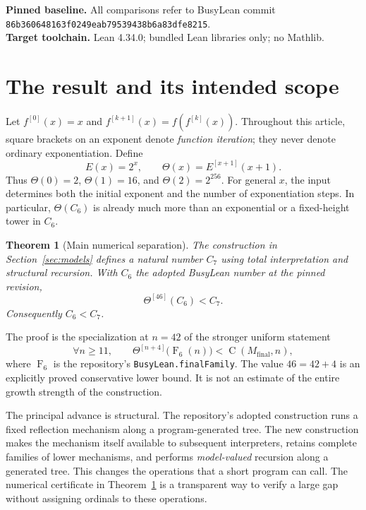 \documentclass[11pt,letterpaper]{article}
\newtheorem{theorem}{Theorem}[section]
\theoremstyle{definition}
\newcommand{\Val}{\operatorname{C}}
\newcommand{\FF}{\operatorname{F}}
\newcommand{\Iter}[2]{#1^{[#2]}}
\newcommand{\code}[1]{\texttt{#1}}
\begin{document}
\noindent\textbf{Pinned baseline.} All comparisons refer to BusyLean commit\\
\hspace*{1em}\code{86b360648163f0249eab79539438b6a83dfe8215}.\\
\textbf{Target toolchain.} Lean 4.34.0; bundled Lean libraries only; no Mathlib.

\newpage
\tableofcontents
\newpage

\section{The result and its intended scope}
\label{sec:result}

Let $\Iter f0(x)=x$ and $\Iter f{k+1}(x)=f(\Iter fk(x))$. Throughout this article,
square brackets on an exponent denote \emph{function iteration}; they never
denote ordinary exponentiation. Define
\begin{equation}\label{eq:theta}
 E(x)=2^x,\qquad \Theta(x)=\Iter E{x+1}(x+1).
\end{equation}
Thus $\Theta(0)=2$, $\Theta(1)=16$, and $\Theta(2)=2^{256}$.
For general $x$, the input determines both the initial exponent and the number
of exponentiation steps. In particular, $\Theta(C_6)$ is already much more
than an exponential or a fixed-height tower in $C_6$.

\begin{theorem}[Main numerical separation]\label{thm:main}
The construction in Section~\ref{sec:models} defines a natural number $C_7$
using total interpretation and structural recursion. With $C_6$ the adopted
BusyLean number at the pinned revision,
\[
                  \Iter\Theta{46}(C_6)<C_7.
\]
Consequently $C_6<C_7$.
\end{theorem}

The proof is the specialization at $n=42$ of the stronger uniform statement
\begin{equation}\label{eq:uniform-main}
 \forall n\ge 11,\qquad
 \Iter\Theta{n+4}\bigl(\FF_6(n)\bigr)<\Val(M_{\mathrm{final}},n),
\end{equation}
where $\FF_6$ is the repository's \code{BusyLean.finalFamily}. The value
$46=42+4$ is an explicitly proved conservative lower bound. It is not an
estimate of the entire growth strength of the construction.

The principal advance is structural. The repository's adopted construction
runs a fixed reflection mechanism along a program-generated tree. The new
construction makes the mechanism itself available to subsequent interpreters,
retains complete families of lower mechanisms, and performs
\emph{model-valued} recursion along a generated tree. This changes the
operations that a short program can call. The numerical certificate in
Theorem~\ref{thm:main} is a transparent way to verify a large gap without
assigning ordinals to these operations.
\end{document}
